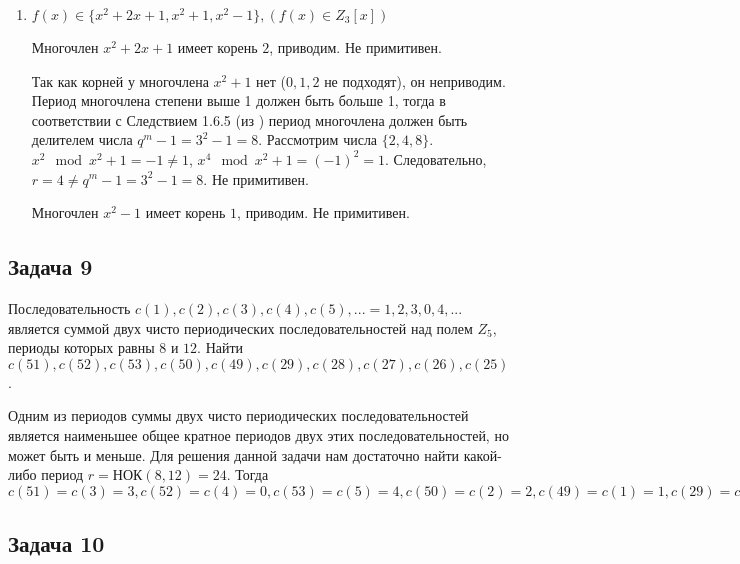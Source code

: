 \documentclass[utf8x, 14pt]{G7-32} %
\begin{document}
\begin{enumerate}
    Так как корней у многочлена $x^2+2x+2$ нет ($0,1,2$ не подходят), он неприводим. Период многочлена степени выше 1 должен быть больше 1, тогда в соответствии с Следствием 1.6.5 (из \cite{hse:Teoria_Gener}) период многочлена должен быть делителем числа $q^m -1 = 3^2 -1 = 8$. Рассмотрим числа $\{2, 4, 8\}$. $x^2 \mod x^2 + 2x +2 = x +1 \neq 1$,  $x^4 \mod x^2 + 2x +2 = (x +1)^2 = x^2 + 2x + 1 = - 1 \neq 1$. Следовательно, $r=8$. Примитивен.

    \item $f(x)\in\{x^2+2x+1, x^2+1, x^2-1\}, (f(x)\in Z_3[x])$
    
     Многочлен $ x^2+2x+1$ имеет корень $2$, приводим. Не примитивен.
     
     Так как корней у многочлена $x^2+1$ нет ($0,1,2$ не подходят), он неприводим. Период многочлена степени выше 1 должен быть больше 1, тогда в соответствии с Следствием 1.6.5 (из \cite{hse:Teoria_Gener}) период многочлена должен быть делителем числа $q^m -1 = 3^2 -1 = 8$. Рассмотрим числа $\{2, 4, 8\}$. $x^2 \mod x^2 + 1 = -1 \neq 1$,  $x^4 \mod x^2 + 1 = (-1)^2 = 1$. Следовательно, $r=4\neq q^m -1 = 3^2 -1 = 8$. Не примитивен.
     
      Многочлен $ x^2-1$ имеет корень $1$, приводим. Не примитивен.
     
\end{enumerate}

\subsection{Задача 9}

Последовательность $c(1),c(2),c(3),c(4),c(5), ... = 1,2,3,0,4,...$ является суммой двух чисто периодических последовательностей над полем $Z_5$, периоды которых равны $8$ и $12$. Найти $c(51), c(52), c(53), c(50), c(49), c(29), c(28), c(27), c(26), c(25)$.

Одним из периодов суммы двух чисто периодических последовательностей является наименьшее общее кратное периодов двух этих последовательностей, но может быть и меньше. Для решения данной задачи нам достаточно найти какой-либо период $r = $НОК$(8, 12) = 24$.
Тогда $c(51)=c(3)=3, c(52)=c(4)=0, c(53)=c(5)=4, c(50)=c(2)=2, c(49)=c(1)=1, c(29)=c(5)=4, c(28)=c(4)=0, c(27)=c(3)=3, c(26)=c(2)=2, c(25)=c(1)=1$

\subsection{Задача 10}
\end{document}
